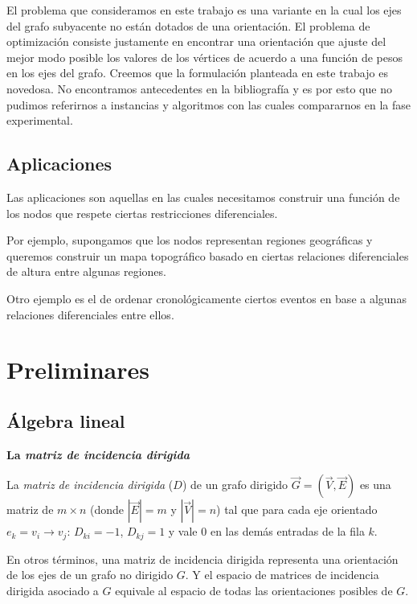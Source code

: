 \documentclass[conference,compsoc,a4paper]{IEEEtran}
\begin{document}
\bigskip

El problema que consideramos en este trabajo es una variante en la 
cual los ejes del grafo subyacente no están dotados de una orientación. 
El problema de optimización consiste justamente en encontrar una 
orientación que ajuste del mejor modo posible los valores de los 
vértices de acuerdo a una función de pesos en los ejes del grafo.
Creemos que la formulación planteada en este trabajo es novedosa.
No encontramos antecedentes en la bibliografía y
es por esto
que no pudimos referirnos a instancias y algoritmos con las cuales compararnos
en la fase experimental.




\subsection{Aplicaciones}

Las aplicaciones son aquellas en las cuales necesitamos construir una 
función de los nodos que respete ciertas restricciones diferenciales.

Por ejemplo, supongamos que los nodos representan regiones geográficas 
y queremos construir un mapa topográfico basado en ciertas relaciones 
diferenciales de altura entre algunas regiones.

Otro ejemplo es el de ordenar cronológicamente ciertos eventos 
en base a algunas relaciones diferenciales entre ellos.

\section{Preliminares}

\subsection{Álgebra lineal}

\textbf{La \textit{matriz de incidencia dirigida}}

\smallskip

La \textit{matriz de incidencia dirigida} ($D$) de un grafo dirigido 
$\vec G = (\vec V, \vec E)$ es una matriz de $m \times n$ (donde $|\vec
 E| = m$ y $|\vec V| = n$) tal que para cada eje orientado 
$e_k=v_i \rightarrow v_j$: $D_{ki} = -1$, $D_{kj} = 1$ y vale $0$ en 
las demás entradas de la fila $k$.

\smallskip

En otros términos, una matriz de incidencia dirigida representa una 
 orientación de los ejes de un grafo no dirigido $G$. Y el 
espacio de matrices de incidencia dirigida asociado a $G$ 
equivale al espacio de todas las orientaciones posibles de $G$.
\end{document}
